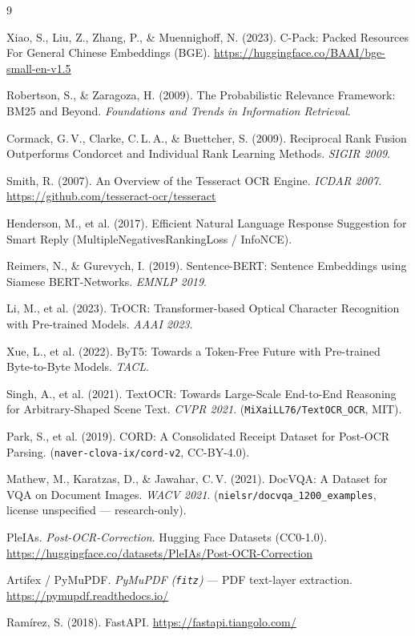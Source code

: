 \documentclass[12pt,a4paper]{article}
\begin{document}
\newpage
\begin{thebibliography}{9}

 Xiao, S., Liu, Z., Zhang, P., \& Muennighoff, N. (2023). C-Pack: Packed Resources For General Chinese Embeddings (BGE). \url{https://huggingface.co/BAAI/bge-small-en-v1.5}

 Robertson, S., \& Zaragoza, H. (2009). The Probabilistic Relevance Framework: BM25 and Beyond. \textit{Foundations and Trends in Information Retrieval}.

 Cormack, G.\,V., Clarke, C.\,L.\,A., \& Buettcher, S. (2009). Reciprocal Rank Fusion Outperforms Condorcet and Individual Rank Learning Methods. \textit{SIGIR 2009}.

 Smith, R. (2007). An Overview of the Tesseract OCR Engine. \textit{ICDAR 2007}. \url{https://github.com/tesseract-ocr/tesseract}

 Henderson, M., et al. (2017). Efficient Natural Language Response Suggestion for Smart Reply (MultipleNegativesRankingLoss / InfoNCE).

 Reimers, N., \& Gurevych, I. (2019). Sentence-BERT: Sentence Embeddings using Siamese BERT-Networks. \textit{EMNLP 2019}.

 Li, M., et al. (2023). TrOCR: Transformer-based Optical Character Recognition with Pre-trained Models. \textit{AAAI 2023}.

 Xue, L., et al. (2022). ByT5: Towards a Token-Free Future with Pre-trained Byte-to-Byte Models. \textit{TACL}.

 Singh, A., et al. (2021). TextOCR: Towards Large-Scale End-to-End Reasoning for Arbitrary-Shaped Scene Text. \textit{CVPR 2021}. (\texttt{MiXaiLL76/TextOCR\_OCR}, MIT).

 Park, S., et al. (2019). CORD: A Consolidated Receipt Dataset for Post-OCR Parsing. (\texttt{naver-clova-ix/cord-v2}, CC-BY-4.0).

 Mathew, M., Karatzas, D., \& Jawahar, C.\,V. (2021). DocVQA: A Dataset for VQA on Document Images. \textit{WACV 2021}. (\texttt{nielsr/docvqa\_1200\_examples}, license unspecified --- research-only).

 PleIAs. \textit{Post-OCR-Correction}. Hugging Face Datasets (CC0-1.0). \url{https://huggingface.co/datasets/PleIAs/Post-OCR-Correction}

 Artifex / PyMuPDF. \textit{PyMuPDF (\texttt{fitz})} --- PDF text-layer extraction. \url{https://pymupdf.readthedocs.io/}

 Ram\'irez, S. (2018). FastAPI. \url{https://fastapi.tiangolo.com/}

\end{thebibliography}
\end{document}
